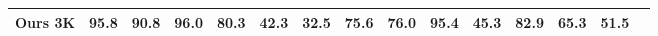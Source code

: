 \begin{table}[h]
{\begin{tabular}{lrrrrrrrrrrrrrr}
Ours 3K &\cellcolor[HTML]{00b1b0}95.8 &\cellcolor[HTML]{00b1b0}90.8 &\cellcolor[HTML]{00b1b0}96.0 &\cellcolor[HTML]{3fb797}80.3 &\cellcolor[HTML]{ff9965}42.3 &\cellcolor[HTML]{ff856f}32.5 &\cellcolor[HTML]{7cbd7f}75.6 &\cellcolor[HTML]{76bc82}76.0 &\cellcolor[HTML]{00b1b0}95.4 &\cellcolor[HTML]{ff9f62}45.3 &\cellcolor[HTML]{1cb4a5}82.9 &\cellcolor[HTML]{ffc74e}65.3 &\cellcolor[HTML]{ffab5c}51.5 \\
\bottomrule
\end{tabular}
}
\end{table}